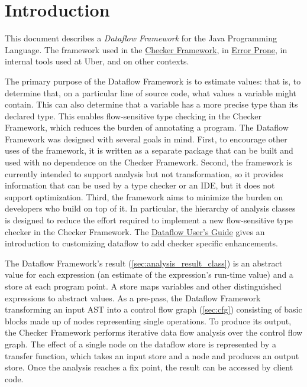 
\section{Introduction}

This document describes a \emph{Dataflow Framework} for the
Java Programming Language.  The framework
used in the \href{https://checkerframework.org/}{Checker Framework}, in
\href{http://errorprone.info/}{Error Prone}, in internal tools used at
Uber, and on other contexts.

The primary purpose of the Dataflow Framework is to estimate values:
that is, to determine that, on a particular line of source code, what
values a variable might contain.  This can also determine that a variable
has a more precise type than its declared type.  This enables
flow-sensitive type checking in the Checker Framework, which
reduces the burden of annotating a program.  The Dataflow Framework was
designed with several goals in mind.  First, to encourage other uses
of the framework, it is written as a separate package that can be
built and used with no dependence on the Checker Framework.  Second,
the framework is currently intended to support analysis but not
transformation, so it provides information that can be used by a type
checker or an IDE, but it does not support optimization.  Third, the
framework aims to minimize the burden on developers who build on top
of it.  In particular, the hierarchy of analysis classes is designed
to reduce the effort required to implement a new flow-sensitive type
checker in the Checker Framework. The
\href{https://docs.google.com/document/d/1oYzbOrrS4ZEEx4wQgIHbijNzcI5CiQAq_-1NrOS8JME/edit?usp=sharing}{Dataflow User's Guide}
gives an introduction to customizing dataflow to add checker specific
enhancements.

The Dataflow Framework's result (\autoref{sec:analysis_result_class})
is an abstract value for each expression (an estimate of the
expression's run-time value) and a store at each program point.  A
store maps variables and other distinguished expressions to abstract
values.  As a pre-pass, the Dataflow Framework transforming an input
AST into a control flow graph (\autoref{sec:cfg}) consisting of basic
blocks made up of nodes representing single operations.  To produce
its output, the Checker Framework performs iterative data flow
analysis over the control flow graph.  The effect of a single node on
the dataflow store is represented by a transfer function, which takes
an input store and a node and produces an output store.  Once the
analysis reaches a fix point, the result can be accessed by client
code.

